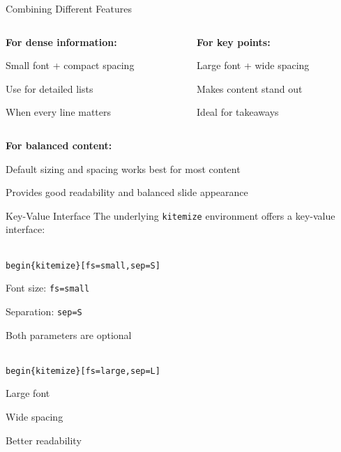 \documentclass[11pt,compress,t,notes=noshow, xcolor=table]{beamer}
\begin{document}
\begin{frame}{Combining Different Features}
  
  \begin{columns}[T]
    \begin{column}{0.48\textwidth}
      \textbf{For dense information:}
      \begin{itemizeS}[small]
        \item Small font + compact spacing
        \item Use for detailed lists
        \item When every line matters
      \end{itemizeS}
    \end{column}
    
    \begin{column}{0.48\textwidth}
      \textbf{For key points:}
      \begin{itemizeL}[large]
        \item Large font + wide spacing
        \item Makes content stand out
        \item Ideal for takeaways
      \end{itemizeL}
    \end{column}
  \end{columns}
  
  \vspace{0.5cm}
  \textbf{For balanced content:}
  \begin{itemizeM}
    \item Default sizing and spacing works best for most content
    \item Provides good readability and balanced slide appearance
  \end{itemizeM}
\end{frame}


\begin{frame}{Key-Value Interface}
  The underlying \texttt{kitemize} environment offers a key-value interface:
  
  \vspace{1ex}
  \texttt{\\begin\{kitemize\}[fs=small,sep=S]}
  \begin{kitemize}[fs=small,sep=S]
    \item Font size: \texttt{fs=small}
    \item Separation: \texttt{sep=S}
    \item Both parameters are optional
  \end{kitemize}
  
  \vspace{1ex}
  \texttt{\\begin\{kitemize\}[fs=large,sep=L]}
  \begin{kitemize}[fs=large,sep=L]
    \item Large font
    \item Wide spacing
    \item Better readability
  \end{kitemize}
\end{frame}
\end{document}
